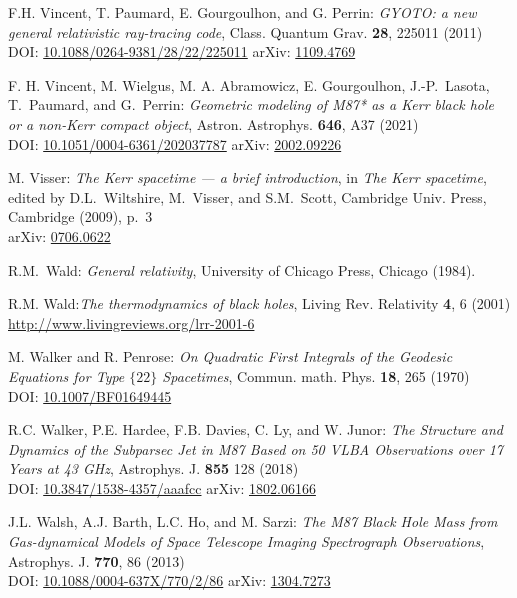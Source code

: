 \begin{thebibliography}{123}
F.H. Vincent, T. Paumard, E. Gourgoulhon, and G. Perrin:
{\em GYOTO: a new general relativistic ray-tracing code},
Class. Quantum Grav. {\bf 28}, 225011 (2011)\\
DOI: \href{https://doi.org/10.1088/0264-9381/28/22/225011}{10.1088/0264-9381/28/22/225011}
\hfill
arXiv: \href{https://arxiv.org/abs/1109.4769}{1109.4769}

F. H. Vincent, M. Wielgus, M. A. Abramowicz, E. Gourgoulhon, J.-P.~Lasota, T.~Paumard,
and G.~Perrin:
{\em Geometric modeling of M87* as a Kerr black hole or a non-Kerr compact object},
Astron. Astrophys. {\bf 646}, A37 (2021)\\
DOI: \href{https://doi.org/10.1051/0004-6361/202037787}{10.1051/0004-6361/202037787}\hfill
arXiv: \href{https://arxiv.org/abs/2002.09226}{2002.09226}

M. Visser: {\em The Kerr spacetime --- a brief introduction},
in {\em The Kerr spacetime}, edited by D.L.~Wiltshire, M.~Visser, and S.M.~Scott,
Cambridge Univ. Press, Cambridge (2009), p.~3\\
arXiv: \href{https://arxiv.org/abs/0706.0622}{0706.0622}

R.M.~Wald: {\em General relativity},
University of Chicago Press, Chicago (1984).

R.M. Wald:{\em The thermodynamics of black holes},
Living Rev. Relativity {\bf 4}, 6 (2001) \\
\url{http://www.livingreviews.org/lrr-2001-6}

M. Walker and R. Penrose: {\em On Quadratic First Integrals of the Geodesic Equations
for Type $\{22\}$ Spacetimes},
Commun. math. Phys. {\bf 18}, 265 (1970)\\
DOI: \href{https://doi.org/10.1007/BF01649445}{10.1007/BF01649445}

R.C. Walker, P.E. Hardee, F.B. Davies, C. Ly, and W. Junor:
{\em The Structure and Dynamics of the Subparsec Jet in M87 Based on 50 VLBA Observations over 17 Years at 43 GHz},
Astrophys. J. {\bf 855} 128 (2018)\\
DOI: \href{https://doi.org/10.3847/1538-4357/aaafcc}{10.3847/1538-4357/aaafcc}\hfill
arXiv: \href{https://arxiv.org/abs/1802.06166}{1802.06166}

J.L. Walsh, A.J. Barth, L.C. Ho, and M. Sarzi:
{\em The M87 Black Hole Mass from Gas-dynamical Models of Space Telescope Imaging Spectrograph Observations},
Astrophys. J. {\bf 770}, 86 (2013)\\
DOI: \href{https://doi.org/10.1088/0004-637X/770/2/86}{10.1088/0004-637X/770/2/86}\hfill
arXiv: \href{https://arxiv.org/abs/1304.7273}{1304.7273}


\end{thebibliography}
